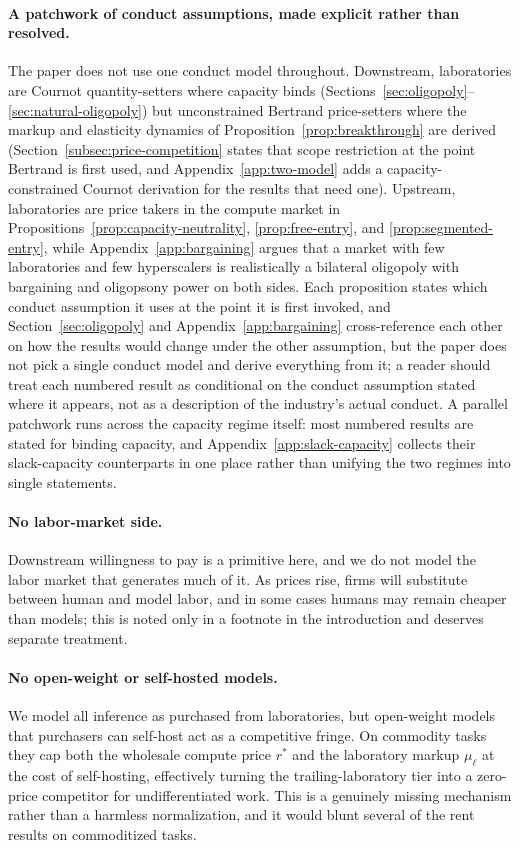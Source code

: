 \documentclass[11pt]{article}
\begin{document}
\paragraph{A patchwork of conduct assumptions, made explicit rather than resolved.} The paper does not use one conduct model throughout. Downstream, laboratories are Cournot quantity-setters where capacity binds (Sections~\ref{sec:oligopoly}--\ref{sec:natural-oligopoly}) but unconstrained Bertrand price-setters where the markup and elasticity dynamics of Proposition~\ref{prop:breakthrough} are derived (Section~\ref{subsec:price-competition} states that scope restriction at the point Bertrand is first used, and Appendix~\ref{app:two-model} adds a capacity-constrained Cournot derivation for the results that need one). Upstream, laboratories are price takers in the compute market in Propositions~\ref{prop:capacity-neutrality}, \ref{prop:free-entry}, and \ref{prop:segmented-entry}, while Appendix~\ref{app:bargaining} argues that a market with few laboratories and few hyperscalers is realistically a bilateral oligopoly with bargaining and oligopsony power on both sides. Each proposition states which conduct assumption it uses at the point it is first invoked, and Section~\ref{sec:oligopoly} and Appendix~\ref{app:bargaining} cross-reference each other on how the results would change under the other assumption, but the paper does not pick a single conduct model and derive everything from it; a reader should treat each numbered result as conditional on the conduct assumption stated where it appears, not as a description of the industry's actual conduct. A parallel patchwork runs across the capacity regime itself: most numbered results are stated for binding capacity, and Appendix~\ref{app:slack-capacity} collects their slack-capacity counterparts in one place rather than unifying the two regimes into single statements.

\paragraph{No labor-market side.} Downstream willingness to pay is a primitive here, and we do not model the labor market that generates much of it. As prices rise, firms will substitute between human and model labor, and in some cases humans may remain cheaper than models; this is noted only in a footnote in the introduction and deserves separate treatment.

\paragraph{No open-weight or self-hosted models.} We model all inference as purchased from laboratories, but open-weight models that purchasers can self-host act as a competitive fringe. On commodity tasks they cap both the wholesale compute price $r^*$ and the laboratory markup $\mu_\ell$ at the cost of self-hosting, effectively turning the trailing-laboratory tier into a zero-price competitor for undifferentiated work. This is a genuinely missing mechanism rather than a harmless normalization, and it would blunt several of the rent results on commoditized tasks.
\end{document}
